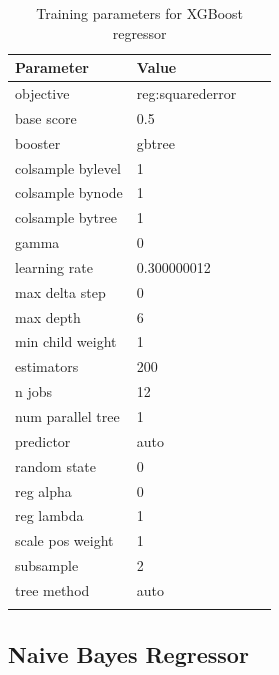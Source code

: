 \documentclass[sn-mathphys]{sn-jnl}%
\theoremstyle{thmstyleone}%
\theoremstyle{thmstyletwo}%
\theoremstyle{thmstylethree}%
\begin{document}
\begin{table}[h]
      \begin{center}
      \begin{minipage}{174pt}
      \caption{Training parameters for XGBoost regressor}\label{table_xgboost_training_params}%
      \begin{tabular}{@{}llll@{}}
      \toprule
      Parameter               & Value \\
      \midrule
      objective               & reg:squarederror  \\
      base score              & 0.5 \\
      booster                 & gbtree  \\
      colsample bylevel       & 1 \\
      colsample bynode        & 1 \\
      colsample bytree        & 1 \\
      gamma\footnotemark[1]   & 0 \\
      learning rate           & 0.300000012 \\
      max delta step          & 0 \\
      max depth               & 6 \\
      min child weight        & 1 \\
      estimators              & 200  \\
      n jobs                  & 12  \\
      num parallel tree       & 1 \\
      predictor               & auto  \\
      random state            & 0 \\
      reg alpha               & 0 \\
      reg lambda              & 1 \\
      scale pos weight        & 1 \\
      subsample               & 2 \\
      tree method             & auto  \\
      \botrule
      \end{tabular}
      \end{minipage}
      \end{center}
\end{table}


\subsection{Naive Bayes Regressor}
\end{document}
